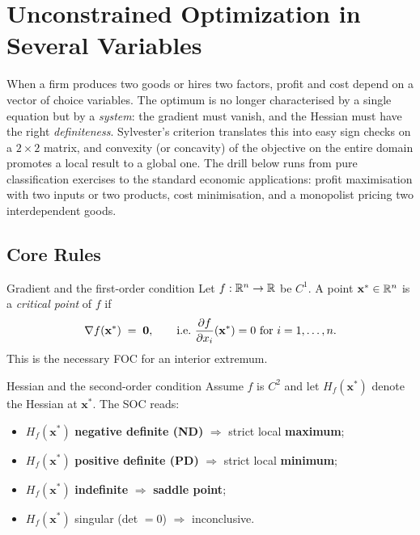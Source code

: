 \chapter{Unconstrained Optimization in Several Variables}

When a firm produces two goods or hires two factors, profit and cost depend
on a vector of choice variables. The optimum is no longer characterised by a
single equation but by a \emph{system}: the gradient must vanish, and the
Hessian must have the right \emph{definiteness}. Sylvester's criterion
translates this into easy sign checks on a $2 \times 2$ matrix, and
convexity (or concavity) of the objective on the entire domain promotes a
local result to a global one. The drill below runs from pure classification
exercises to the standard economic applications: profit maximisation with two inputs
or two products, cost minimisation, and a monopolist pricing two
interdependent goods.

\section{Core Rules}

\begin{rulebox}{Gradient and the first-order condition}
Let $f : \mathbb{R}^n \to \mathbb{R}$ be $C^1$. A point $\mathbf{x}^* \in \mathbb{R}^n$ is a
\emph{critical point} of $f$ if
\[
\nabla f(\mathbf{x}^*) \;=\; \mathbf{0}, \qquad \text{i.e.\ }
\frac{\partial f}{\partial x_i}(\mathbf{x}^*) = 0 \text{ for } i = 1, \dots, n.
\]
This is the necessary FOC for an interior extremum.
\end{rulebox}

\begin{rulebox}{Hessian and the second-order condition}
Assume $f$ is $C^2$ and let $H_f(\mathbf{x}^*)$ denote the Hessian at
$\mathbf{x}^*$. The SOC reads:
\begin{itemize}
    \item $H_f(\mathbf{x}^*)$ \textbf{negative definite (ND)} $\Rightarrow$ strict local \textbf{maximum};
    \item $H_f(\mathbf{x}^*)$ \textbf{positive definite (PD)} $\Rightarrow$ strict local \textbf{minimum};
    \item $H_f(\mathbf{x}^*)$ \textbf{indefinite} $\Rightarrow$ \textbf{saddle point};
    \item $H_f(\mathbf{x}^*)$ singular (det $=0$) $\Rightarrow$ inconclusive.
\end{itemize}
\end{rulebox}

